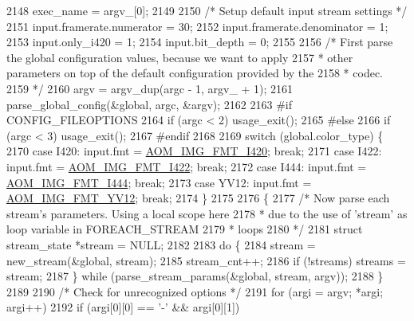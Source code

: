 \begin{DoxyCodeInclude}
{{{{{{{{{{{{{{{{{{{{{{{{{{{{{{{{{{{{{{{{{{{{{{{{{{{2148   exec\_name = argv\_[0];
2149 
2150   \textcolor{comment}{/* Setup default input stream settings */}
2151   input.framerate.numerator = 30;
2152   input.framerate.denominator = 1;
2153   input.only\_i420 = 1;
2154   input.bit\_depth = 0;
2155 
2156   \textcolor{comment}{/* First parse the global configuration values, because we want to apply}
2157 \textcolor{comment}{   * other parameters on top of the default configuration provided by the}
2158 \textcolor{comment}{   * codec.}
2159 \textcolor{comment}{   */}
2160   argv = argv\_dup(argc - 1, argv\_ + 1);
2161   parse\_global\_config(&global, argc, &argv);
2162 
2163 \textcolor{preprocessor}{#if CONFIG\_FILEOPTIONS}
2164   \textcolor{keywordflow}{if} (argc < 2) usage\_exit();
2165 \textcolor{preprocessor}{#else}
2166   \textcolor{keywordflow}{if} (argc < 3) usage\_exit();
2167 \textcolor{preprocessor}{#endif}
2168 
2169   \textcolor{keywordflow}{switch} (global.color\_type) \{
2170     \textcolor{keywordflow}{case} I420: input.fmt = \hyperlink{aom__image_8h_a930317c04b4bd0a660bb5e744055523cabd778a3d697463e89d12a1117f417b60}{AOM\_IMG\_FMT\_I420}; \textcolor{keywordflow}{break};
2171     \textcolor{keywordflow}{case} I422: input.fmt = \hyperlink{aom__image_8h_a930317c04b4bd0a660bb5e744055523cab2f75281e94ebc0f0bc728ef287cd3e8}{AOM\_IMG\_FMT\_I422}; \textcolor{keywordflow}{break};
2172     \textcolor{keywordflow}{case} I444: input.fmt = \hyperlink{aom__image_8h_a930317c04b4bd0a660bb5e744055523ca89d423506e948ab7d3b98b5750b92655}{AOM\_IMG\_FMT\_I444}; \textcolor{keywordflow}{break};
2173     \textcolor{keywordflow}{case} YV12: input.fmt = \hyperlink{aom__image_8h_a930317c04b4bd0a660bb5e744055523cad28244100a2754409f285b77a3db90a0}{AOM\_IMG\_FMT\_YV12}; \textcolor{keywordflow}{break};
2174   \}
2175 
2176   \{
2177     \textcolor{comment}{/* Now parse each stream's parameters. Using a local scope here}
2178 \textcolor{comment}{     * due to the use of 'stream' as loop variable in FOREACH\_STREAM}
2179 \textcolor{comment}{     * loops}
2180 \textcolor{comment}{     */}
2181     \textcolor{keyword}{struct }stream\_state *stream = NULL;
2182 
2183     \textcolor{keywordflow}{do} \{
2184       stream = new\_stream(&global, stream);
2185       stream\_cnt++;
2186       \textcolor{keywordflow}{if} (!streams) streams = stream;
2187     \} \textcolor{keywordflow}{while} (parse\_stream\_params(&global, stream, argv));
2188   \}
2189 
2190   \textcolor{comment}{/* Check for unrecognized options */}
2191   \textcolor{keywordflow}{for} (argi = argv; *argi; argi++)
2192     \textcolor{keywordflow}{if} (argi[0][0] == \textcolor{charliteral}{'-'} && argi[0][1])
}}}}}}}}}}}}}}}}}}}}}}}}}}}}}}}}}}}}}}}}}}}}}}}}}}}
\end{DoxyCodeInclude}
